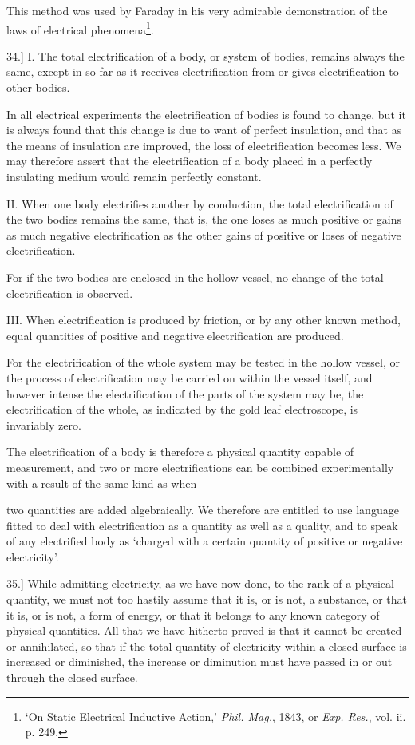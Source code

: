 \documentclass[11pt,a4paper]{article}
\begin{document}
This method was used by Faraday in his very admirable demonstration of
the laws of electrical phenomena\footnote{`On Static Electrical
Inductive Action,' \textit{Phil. Mag.}, 1843, or \textit{Exp. Res.},
vol. ii. p. 249.}.

34.] I. The total electrification of a body, or system of bodies,
remains always the same, except in so far as it receives electrification
from or gives electrification to other bodies.

In all electrical experiments the electrification of bodies is found to
change, but it is always found that this change is due to want of
perfect insulation, and that as the means of insulation are improved,
the loss of electrification becomes less. We may therefore assert that
the electrification of a body placed in a perfectly insulating medium
would remain perfectly constant.

II. When one body electrifies another by conduction, the total
electrification of the two bodies remains the same, that is, the one
loses as much positive or gains as much negative electrification as the
other gains of positive or loses of negative electrification.

For if the two bodies are enclosed in the hollow vessel, no change of
the total electrification is observed.

III. When electrification is produced by friction, or by any other known
method, equal quantities of positive and negative electrification are
produced.

For the electrification of the whole system may be tested in the hollow
vessel, or the process of electrification may be carried on within the
vessel itself, and however intense the electrification of the parts of
the system may be, the electrification of the whole, as indicated by the
gold leaf electroscope, is invariably zero.

The electrification of a body is therefore a physical quantity capable
of measurement, and two or more electrifications can be combined
experimentally with a result of the same kind as when

\clearpage
\setcounter{footnote}{0}

two quantities are added algebraically. We therefore are entitled to use
language fitted to deal with electrification as a quantity as well as a
quality, and to speak of any electrified body as `charged with a certain
quantity of positive or negative electricity'.

35.] While admitting electricity, as we have now done, to the rank of a
physical quantity, we must not too hastily assume that it is, or is not,
a substance, or that it is, or is not, a form of energy, or that it
belongs to any known category of physical quantities. All that we have
hitherto proved is that it cannot be created or annihilated, so that if
the total quantity of electricity within a closed surface is increased
or diminished, the increase or diminution must have passed in or out
through the closed surface.
\end{document}
